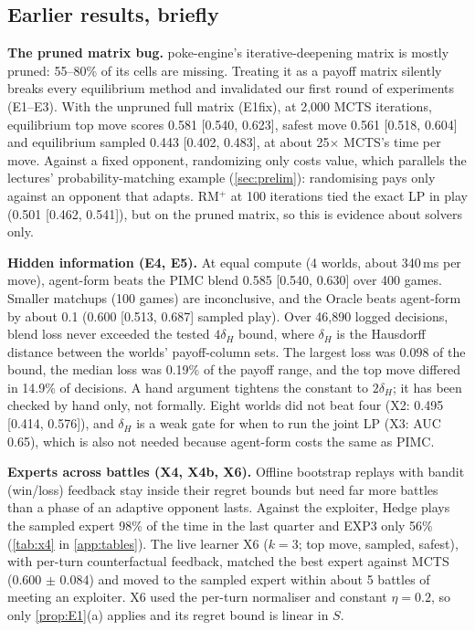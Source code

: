 \documentclass[10pt]{article}
\theoremstyle{plain}
\theoremstyle{definition}
\theoremstyle{remark}
\begin{document}
\subsection{Earlier results, briefly}
\label{sec:exp-earlier}
\textbf{The pruned matrix bug.} poke-engine's iterative-deepening matrix is mostly pruned: 55--80\% of its cells are missing. Treating it as a payoff matrix silently breaks every equilibrium method and invalidated our first round of experiments (E1--E3). With the unpruned full matrix (E1fix), at 2,000 MCTS iterations, equilibrium top move scores 0.581 [0.540, 0.623], safest move 0.561 [0.518, 0.604] and equilibrium sampled 0.443 [0.402, 0.483], at about 25$\times$ MCTS's time per move. Against a fixed opponent, randomizing only costs value, which parallels the lectures' probability-matching example (\cref{sec:prelim}): randomising pays only against an opponent that adapts. RM$^+$ at 100 iterations tied the exact LP in play (0.501 [0.462, 0.541]), but on the pruned matrix, so this is evidence about solvers only.

\textbf{Hidden information (E4, E5).} At equal compute (4 worlds, about 340\,ms per move), agent-form beats the PIMC blend 0.585 [0.540, 0.630] over 400 games. Smaller matchups (100 games) are inconclusive, and the Oracle beats agent-form by about 0.1 (0.600 [0.513, 0.687] sampled play). Over 46,890 logged decisions, blend loss never exceeded the tested $4\delta_H$ bound, where $\delta_H$ is the Hausdorff distance between the worlds' payoff-column sets. The largest loss was 0.098 of the bound, the median loss was 0.19\% of the payoff range, and the top move differed in 14.9\% of decisions. A hand argument tightens the constant to $2\delta_H$; it has been checked by hand only, not formally. Eight worlds did not beat four (X2: 0.495 [0.414, 0.576]), and $\delta_H$ is a weak gate for when to run the joint LP (X3: AUC 0.65), which is also not needed because agent-form costs the same as PIMC.

\textbf{Experts across battles (X4, X4b, X6).} Offline bootstrap replays with bandit (win/loss) feedback stay inside their regret bounds but need far more battles than a phase of an adaptive opponent lasts. Against the exploiter, Hedge plays the sampled expert 98\% of the time in the last quarter and EXP3 only 56\% (\cref{tab:x4} in \cref{app:tables}). The live learner X6 ($k=3$; top move, sampled, safest), with per-turn counterfactual feedback, matched the best expert against MCTS (0.600 $\pm$ 0.084) and moved to the sampled expert within about 5 battles of meeting an exploiter. X6 used the per-turn normaliser and constant $\eta=0.2$, so only \cref{prop:E1}(a) applies and its regret bound is linear in $S$.
\end{document}
